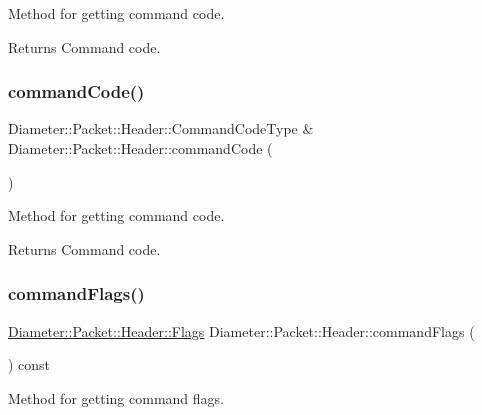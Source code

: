 Method for getting command code. 

\begin{DoxyReturn}{Returns}
Command code. 
\end{DoxyReturn}
\mbox{\label{classDiameter_1_1Packet_1_1Header_a3ce08a9d9381e2e398a553b5a3442c36}} 
\subsubsection{\texorpdfstring{command\+Code()}{commandCode()}\hspace{0.1cm}{\footnotesize\ttfamily [2/2]}}
{\footnotesize\ttfamily Diameter\+::\+Packet\+::\+Header\+::\+Command\+Code\+Type \& Diameter\+::\+Packet\+::\+Header\+::command\+Code (\begin{DoxyParamCaption}{ }\end{DoxyParamCaption})}



Method for getting command code. 

\begin{DoxyReturn}{Returns}
Command code. 
\end{DoxyReturn}
\mbox{\label{classDiameter_1_1Packet_1_1Header_a35c3ef1bcffaa089d797e706b2502221}} 
\subsubsection{\texorpdfstring{command\+Flags()}{commandFlags()}\hspace{0.1cm}{\footnotesize\ttfamily [1/2]}}
{\footnotesize\ttfamily \hyperlink{classDiameter_1_1Packet_1_1Header_1_1Flags}{Diameter\+::\+Packet\+::\+Header\+::\+Flags} Diameter\+::\+Packet\+::\+Header\+::command\+Flags (\begin{DoxyParamCaption}{ }\end{DoxyParamCaption}) const}



Method for getting command flags. 

